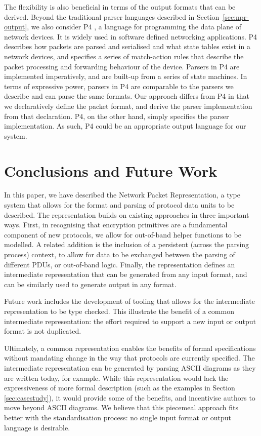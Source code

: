 \documentclass[10pt,sigconf]{acmart}
\begin{document}
The flexibility is also beneficial in terms of the output formats that can be derived.
Beyond the traditional parser languages described in
Section~\ref{sec:npr-output}, we also consider P4
\cite{bosshart:2014:p4,p4consortium:2018:v16spec-20180531}, a language for
programming the data plane of network devices. It is widely used in software defined
networking applications. P4 describes how packets are parsed and serialised and what state
tables exist in a network devices, and specifies a series of match-action rules that
describe the packet processing and forwarding behaviour of the device. Parsers in P4 are
implemented imperatively, and are built-up from a series of state machines. In terms of
expressive power, parsers in P4 are comparable to the parsers we describe and can parse
the same formats. Our approach differs from P4 in that we declaratively define the packet
format, and derive the parser implementation from that declaration. P4, on the other hand,
simply specifies the parser implementation. As such, P4 could be an appropriate output
language for our system.

\section{Conclusions and Future Work}
\label{sec:conclusion}

In this paper, we have described the Network Packet Representation, a type system that
allows for the format and parsing of protocol data units to be described. The
representation builds on existing approaches in three important ways. First, in
recognising that encryption primitives are a fundamental component of new protocols, we
allow for out-of-band helper functions to be modelled. A related addition is the inclusion
of a persistent (across the parsing process) context, to allow for data to be exchanged
between the parsing of different PDUs, or out-of-band logic. Finally, the representation
defines an intermediate representation that can be generated from any input format, and
can be similarly used to generate output in any format.

Future work includes the development of tooling that allows for the intermediate
representation to be type checked. This illustrate the benefit of a common intermediate
representation: the effort required to support a new input or output format is not
duplicated.

Ultimately, a common representation enables the benefits of formal specifications without
mandating change in the way that protocols are currently specified. The intermediate
representation can be generated by parsing ASCII diagrams as they are written today, for
example. While this representation would lack the expressiveness of more formal
description (such as the examples in Section \ref{sec:casestudy}), it would provide some
of the benefits, and incentivise authors to move beyond ASCII diagrams. We believe that
this piecemeal approach fits better with the standardisation process: no single input
format or output language is desirable.
\end{document}
